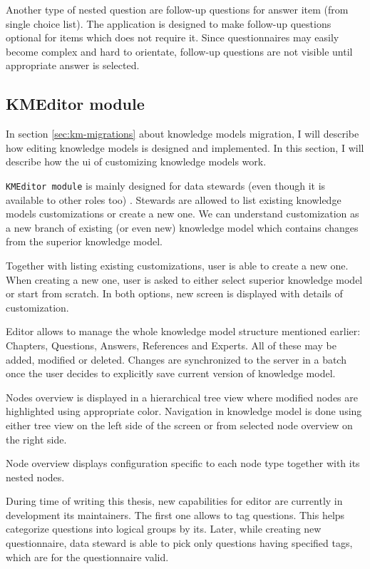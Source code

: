Another type of nested question are follow-up questions for answer item (from single choice list).
The application is designed to make follow-up questions optional for items which does not require it.
Since questionnaires may easily become complex and hard to orientate, follow-up questions are not visible until appropriate answer is selected.

\subsection{KMEditor module}\label{sec:kmeditor-module}

In section \ref{sec:km-migrations} about knowledge models migration, I will describe how editing knowledge models is designed and implemented.
In this section, I will describe how the \gls{ui} of customizing knowledge models work.

\texttt{KMEditor module} is mainly designed for data stewards (even though it is available to other roles too) .
Stewards are allowed to list existing knowledge models customizations or create a new one.
We can understand customization as a new branch of existing (or even new) knowledge model which contains changes from the superior knowledge model.

Together with listing existing customizations, user is able to create a new one.
When creating a new one, user is asked to either select superior knowledge model or start from scratch.
In both options, new screen is displayed with details of customization.

Editor allows to manage the whole knowledge model structure mentioned earlier: Chapters, Questions, Answers, References and Experts.
All of these may be added, modified or deleted.
Changes are synchronized to the server in a batch once the user decides to explicitly save current version of knowledge model.

Nodes overview is displayed in a hierarchical tree view where modified nodes are highlighted using appropriate color.
Navigation in knowledge model is done using either tree view on the left side of the screen or from selected node overview on the right side.

Node overview displays configuration specific to each node type together with its nested nodes.

During time of writing this thesis, new capabilities for editor are currently in development its maintainers.
The first one allows to tag questions.
This helps categorize questions into logical groups by its.
Later, while creating new questionnaire, data steward is able to pick only questions having specified tags, which are for the questionnaire valid.

